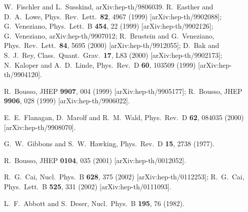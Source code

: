 \documentclass[a4paper,12pt]{article}
\begin{document}
\begin{thebibliography}{99}
W.~Fischler and L.~Susskind,
arXiv:hep-th/9806039.
R.~Easther and D.~A.~Lowe,
Phys.\ Rev.\ Lett.\  {\bf 82}, 4967 (1999) [arXiv:hep-th/9902088];
G.~Veneziano,
Phys.\ Lett.\ B {\bf 454}, 22 (1999) [arXiv:hep-th/9902126];
G.~Veneziano,
arXiv:hep-th/9907012;
R.~Brustein and G.~Veneziano,
Phys.\ Rev.\ Lett.\  {\bf 84}, 5695 (2000) [arXiv:hep-th/9912055];
D.~Bak and S.~J.~Rey,
Class.\ Quant.\ Grav.\  {\bf 17}, L83 (2000)
[arXiv:hep-th/9902173];
N.~Kaloper and A.~D.~Linde,
Phys.\ Rev.\ D {\bf 60}, 103509 (1999) [arXiv:hep-th/9904120].

R.~Bousso,
JHEP {\bf 9907}, 004 (1999) [arXiv:hep-th/9905177];
R.~Bousso,
JHEP {\bf 9906}, 028 (1999) [arXiv:hep-th/9906022].

E.~E.~Flanagan, D.~Marolf and R.~M.~Wald,
Phys.\ Rev.\ D {\bf 62}, 084035 (2000) [arXiv:hep-th/9908070].

G.~W.~Gibbons and S.~W.~Hawking,
Phys.\ Rev.\ D {\bf 15}, 2738 (1977).

R.~Bousso,
JHEP {\bf 0104}, 035 (2001) [arXiv:hep-th/0012052].

R.~G.~Cai,
Nucl.\ Phys.\ B {\bf 628}, 375 (2002) [arXiv:hep-th/0112253];
R.~G.~Cai,
Phys.\ Lett.\ B {\bf 525}, 331 (2002) [arXiv:hep-th/0111093].

L.~F.~Abbott and S.~Deser,
Nucl.\ Phys.\ B {\bf 195}, 76 (1982).


\end{thebibliography}
\end{document}

